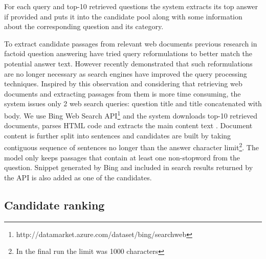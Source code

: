 \documentclass[]{article}
\begin{document}
For each query and top-10 retrieved questions the system extracts its top answer if provided and puts it into the candidate pool along with some information about the corresponding question and its category.

To extract candidate passages from relevant web documents previous research in factoid question answering have tried query reformulations \cite{Agichtein:2001:LSE:371920.371976} to better match the potential answer text.
However recently \cite{askmsr_plus15} demonstrated that such reformulations are no longer necessary as search engines have improved the query processing techniques.
Inspired by this observation and considering that retrieving web documents and extracting passages from them is more time consuming, the system issues only 2 web search queries: question title and title concatenated with body. 
We use Bing Web Search API\footnote{http://datamarket.azure.com/dataset/bing/searchweb} and the system downloads top-10 retrieved documents, parses HTML code and extracts the main content text \cite{Kohlschutter_2010}.
Document content is further split into sentences \cite{manning2014stanford} and candidates are built by taking contiguous sequence of sentences no longer than the answer character limit\footnote{In the final run the limit was 1000 characters}.
The model only keeps passages that contain at least one non-stopword from the question.
Snippet generated by Bing and included in search results returned by the API is also added as one of the candidates.

\subsection{Candidate ranking}
\end{document}
